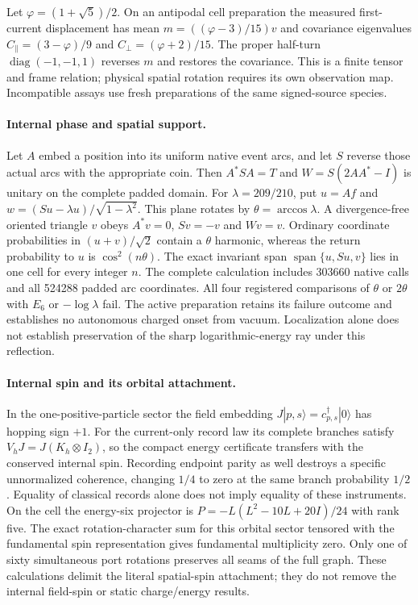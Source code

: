 Let $\varphi=(1+\sqrt5)/2$. On an antipodal cell preparation the measured
first-current displacement has mean
$m=((\varphi-3)/15)v$ and covariance eigenvalues
$C_\parallel=(3-\varphi)/9$ and $C_\perp=(\varphi+2)/15$.
The proper half-turn $\operatorname{diag}(-1,-1,1)$ reverses $m$ and
restores the covariance. This is a finite tensor and frame relation;
physical spatial rotation requires its own observation map. Incompatible
assays use fresh preparations of the same signed-source species.

\paragraph{Internal phase and spatial support.}
Let $A$ embed a position into its uniform native event arcs, and let $S$
reverse those actual arcs with the appropriate coin. Then $A^*SA=T$ and
$W=S(2AA^*-I)$ is unitary on the complete padded domain. For
$\lambda=209/210$, put $u=Af$ and
$w=(Su-\lambda u)/\sqrt{1-\lambda^2}$. This plane rotates by
$\theta=\arccos\lambda$. A divergence-free oriented triangle $v$ obeys
$A^*v=0$, $Sv=-v$ and $Wv=v$. Ordinary coordinate probabilities in
$(u+v)/\sqrt2$ contain a $\theta$ harmonic, whereas the return
probability to $u$ is $\cos^2(n\theta)$. The exact invariant span
$\operatorname{span}\{u,Su,v\}$ lies in one cell for every integer $n$.
The complete calculation includes 303660 native calls and all 524288
padded arc coordinates. All four registered comparisons of $\theta$ or
$2\theta$ with $E_6$ or $-\log\lambda$ fail. The active preparation
retains its failure outcome and establishes no autonomous charged onset
from vacuum. Localization alone does not establish preservation of the
sharp logarithmic-energy ray under this reflection.

\paragraph{Internal spin and its orbital attachment.}
In the one-positive-particle sector the field embedding
$J|p,s\rangle=c^\dagger_{p,s}|0\rangle$ has hopping sign $+1$.
For the current-only record law its complete branches satisfy
$V_hJ=J(K_h\otimes I_2)$, so the compact energy certificate transfers
with the conserved internal spin. Recording endpoint parity as well
destroys a specific unnormalized coherence, changing $1/4$ to zero at
the same branch probability $1/2$. Equality of classical records alone
does not imply equality of these instruments.
On the cell the energy-six projector is
$P=-L(L^2-10L+20I)/24$ with rank five. The exact rotation-character
sum for this orbital sector tensored with the fundamental spin
representation gives fundamental multiplicity zero. Only one of sixty
simultaneous port rotations preserves all seams of the full graph.
These calculations delimit the literal spatial-spin attachment; they
do not remove the internal field-spin or static charge/energy results.

